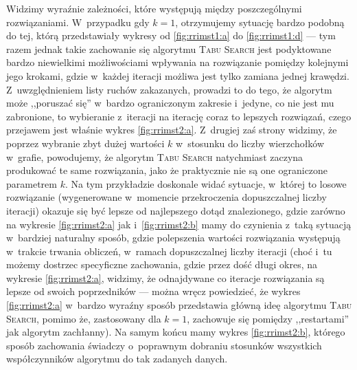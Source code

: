 Widzimy wyraźnie zależności, które występują między poszczególnymi rozwiązaniami. W~przypadku gdy $k = 1$, otrzymujemy sytuację bardzo podobną do tej, którą przedstawiały wykresy od \ref{fig:rrimst1:a} do \ref{fig:rrimst1:d} --- tym razem jednak takie zachowanie się algorytmu \textsc{Tabu Search} jest podyktowane bardzo niewielkimi możliwościami wpływania na rozwiązanie pomiędzy kolejnymi jego krokami, gdzie w~każdej iteracji możliwa jest tylko zamiana jednej krawędzi. Z~uwzględnieniem listy ruchów zakazanych, prowadzi to do tego, że algorytm może ,,poruszać się'' w~bardzo ograniczonym zakresie i~jedyne, co nie jest mu zabronione, to wybieranie z~iteracji na iterację coraz to lepszych rozwiązań, czego przejawem jest właśnie wykres \ref{fig:rrimst2:a}. Z~drugiej zaś strony widzimy, że poprzez wybranie zbyt dużej wartości $k$ w~stosunku do liczby wierzchołków w~grafie, powodujemy, że algorytm \textsc{Tabu Search} natychmiast zaczyna produkować te same rozwiązania, jako że praktycznie nie są one ograniczone parametrem $k$. Na tym przykładzie doskonale widać sytuacje, w~której to losowe rozwiązanie (wygenerowane w~momencie przekroczenia dopuszczalnej liczby iteracji) okazuje się być lepsze od najlepszego dotąd znalezionego, gdzie zarówno na wykresie \ref{fig:rrimst2:a} jak i~\ref{fig:rrimst2:b} mamy do czynienia z~taką sytuacją w~bardziej naturalny sposób, gdzie polepszenia wartości rozwiązania występują w~trakcie trwania obliczeń, w~ramach dopuszczalnej liczby iteracji (choć i~tu możemy dostrzec specyficzne zachowania, gdzie przez dość długi okres, na wykresie \ref{fig:rrimst2:a}, widzimy, że odnajdywane co iteracje rozwiązania są lepsze od swoich poprzedników --- można wręcz powiedzieć, że wykres \ref{fig:rrimst2:a} w~bardzo wyraźny sposób przedstawia główną ideę algorytmu \textsc{Tabu Search}, pomimo że, zastosowany dla $k = 1$, zachowuje się pomiędzy ,,restartami'' jak algorytm zachłanny). Na samym końcu mamy wykres \ref{fig:rrimst2:b}, którego sposób zachowania świadczy o~poprawnym dobraniu stosunków wszystkich współczynników algorytmu do tak zadanych danych. 

